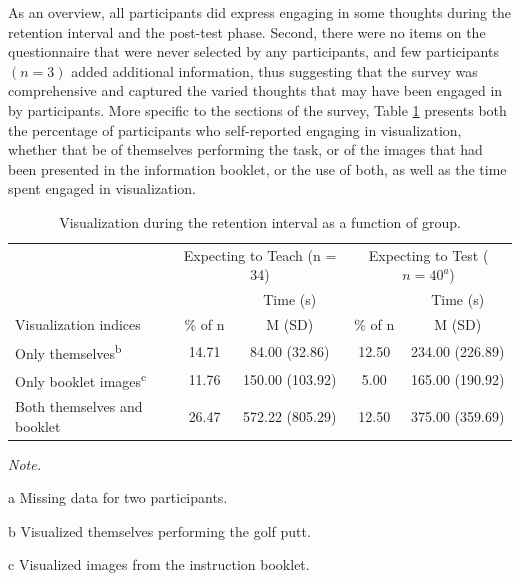 \documentclass[
  english,
  man,floatsintext]{apa7}
\begin{document}
As an overview, all participants did express engaging in some thoughts during the retention interval and the post-test phase. Second, there were no items on the questionnaire that were never selected by any participants, and few participants \((n = 3)\) added additional information, thus suggesting that the survey was comprehensive and captured the varied thoughts that may have been engaged in by participants. More specific to the sections of the survey, Table \ref{tab:table3} presents both the percentage of participants who self-reported engaging in visualization, whether that be of themselves performing the task, or of the images that had been presented in the information booklet, or the use of both, as well as the time spent engaged in visualization.

\vspace{2em}

\begin{table}

\caption{\label{tab:table3}Visualization during the retention interval as a function of group.}
\fontsize{11}{13}\selectfont
\begin{threeparttable}
\begin{tabular}[t]{lcccc}
\toprule
\multicolumn{1}{c}{ } & \multicolumn{2}{c}{Expecting to Teach (n = 34)} & \multicolumn{2}{c}{Expecting to Test ($n = 40^{a}$)} \\
\cmidrule(l{3pt}r{3pt}){2-3} \cmidrule(l{3pt}r{3pt}){4-5}
\multicolumn{1}{c}{ } & \multicolumn{1}{c}{ } & \multicolumn{1}{c}{Time (s)} & \multicolumn{1}{c}{ } & \multicolumn{1}{c}{Time (s)} \\
\cmidrule(l{3pt}r{3pt}){3-3} \cmidrule(l{3pt}r{3pt}){5-5}
Visualization indices & \% of n & M (SD) & \% of n & M (SD)\\
\midrule
Only themselves\textsuperscript{b} & 14.71 & 84.00 (32.86) & 12.50 & 234.00 (226.89)\\
Only booklet images\textsuperscript{c} & 11.76 & 150.00 (103.92) & 5.00 & 165.00 (190.92)\\
Both themselves and booklet & 26.47 & 572.22 (805.29) & 12.50 & 375.00 (359.69)\\
\bottomrule
\end{tabular}
\begin{tablenotes}
\item \textit{Note.} 
\item[a] Missing data for two participants.
\item[b] Visualized themselves performing the golf putt.
\item[c] Visualized images from the instruction booklet.
\end{tablenotes}
\end{threeparttable}
\end{table}
\end{document}
